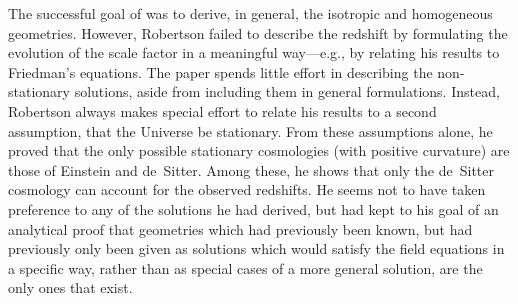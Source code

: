 The successful goal of \cite{Robertson1929}  was to derive, in general, the isotropic and homogeneous geometries. However, Robertson failed to describe the redshift by formulating the evolution of the scale factor in a meaningful way---e.g., by relating his results to Friedman's equations. The paper spends little effort in describing the non-stationary solutions, aside from including them in general formulations. Instead, Robertson always makes special effort to relate his results to a second assumption, that the Universe be stationary. From these assumptions alone, he proved that the only possible stationary cosmologies (with positive curvature) are those of Einstein and de~Sitter. Among these, he shows that only the de~Sitter cosmology can account for the observed redshifts. He seems not to have taken preference to any of the solutions he had derived, but had kept to his goal of an analytical proof that geometries which had previously been known, but had previously only been given as solutions which would satisfy the field equations in a specific way, rather than as special cases of a more general solution, are the only ones that exist.

